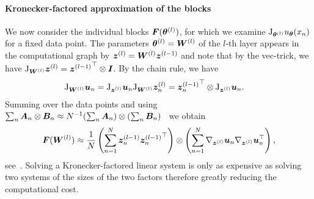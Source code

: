 \paragraph{Kronecker-factored approximation of the blocks}
We now consider the individual blocks ${\bm{F}}({\bm{\theta}}^{(l)})$, for which we examine $\mathrm{J}_{{\bm{\theta}}^{(l)}} u_{{\bm{\theta}}}(x_n)$ for a fixed data point. 
The parameters ${\bm{\theta}}^{(l)} = {\bm{W}}^{(l)}$ of the $l$-th layer appears in the computational graph by ${\bm{z}}^{(l)} = {\bm{W}}^{(l)}{\bm{z}}^{(l-1)}$ and note that by the vec-trick, we have $\mathrm{J}_{{\bm{W}}^{(l)}} {\bm{z}}^{(l)} = {{\bm{z}}^{(l-1)}}^\top \otimes {\bm{I}}$. 
By the chain rule, we have
\begin{align}
    \jac_{\mW^{(l)}} \vu_n%
    & = \jac_{\vz^{(l)}}  \vu_n \jac_{\mW^{(l)}} \vz_n^{(l)}%
    = {\vz^{(l-1)}_n}^\top\otimes  \jac_{\vz^{(l)}}  \vu_n.%
\end{align}
Summing over the data points and using  $\sum_n {\bm{A}}_n \otimes {\bm{B}}_n \approx N^{-1}(\sum_n {\bm{A}}_n) \otimes (\sum_n {\bm{B}}_n)$~\citep{martens2015optimizing} we obtain 
\begin{equation}
    \mF(\mW^{(l)}) %
    \approx \frac1N\left(\sum_{n=1}^N \vz^{(l-1)}_n {\vz^{(l-1)}_n}^\top \right)\otimes \left(\sum_{n=1}^N\nabla_{\vz^{(l)}}  \vu_n\nabla_{\vz^{(l)}}  \vu_n^\top\right),
\end{equation}
see~\citep{eschenhagen2023kroneckerfactored}. 
Solving a Kronecker-factored linear system is only as expensive as solving two systems of the sizes of the two factors therefore greatly reducing the computational cost. 


